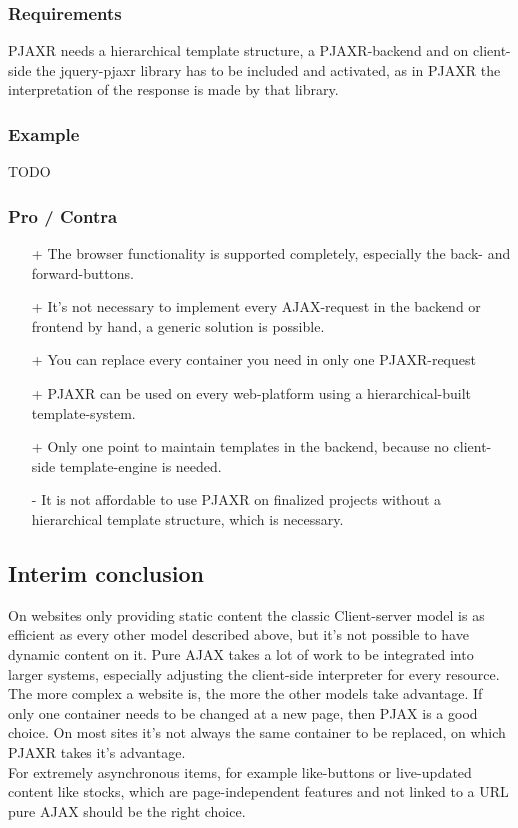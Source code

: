 \documentclass[f,bachelor,binding,twoside,palatino]{WeSTthesis}
\def \ajax {AJAX}
\def \pjax {PJAX}
\def \pjaxr {PJAXR}
\def \pjaxrRequest {PJAXR-request}
\begin{document}
    \subsubsection{Requirements}
    \pjaxr{} needs a hierarchical template structure, a \pjaxr{}-backend and on client-side the jquery-pjaxr library has to be included and activated, as in \pjaxr{} the interpretation of the response is made by that library.

    \subsubsection{Example}
    TODO
      
    \subsubsection{Pro / Contra}
      \begin{itemize}
  	    \item[+]{The browser functionality is supported completely, especially the back- and forward-buttons.}
  	    \item[+]{It's not necessary to implement every \ajax{}-request in the backend or  frontend by hand, a generic solution is possible.}
  	    \item[+]{You can replace every container you need in only one \pjaxrRequest{}}
  	    \item[+]{\pjaxr{} can be used on every web-platform using a hierarchical-built template-system.}
  	    \item[+]{Only one point to maintain templates in the backend, because no client-side template-engine is needed.}
        \item[-]{It is not affordable to use \pjaxr{} on finalized projects without a hierarchical template structure, which is necessary.}
      \end{itemize}


  \subsection{Interim conclusion}
  On websites only providing static content the classic Client-server model is as efficient as every other model described above, but it's not possible to have dynamic content on it.
  Pure \ajax{} takes a lot of work to be integrated into larger systems, especially adjusting the client-side interpreter for every resource.
  The more complex a website is, the more the other models take advantage.
  If only one container needs to be changed at a new page, then \pjax{} is a good choice.
  On most sites it's not always the same container to be replaced, on which \pjaxr{} takes it's advantage.\\
  For extremely asynchronous items, for example like-buttons or live-updated content like stocks, which are page-independent features and not linked to a URL pure \ajax{} should be the right choice.
\end{document}
